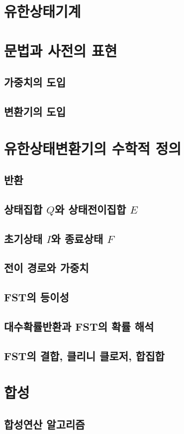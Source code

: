 \documentclass[../main.tex]{subfiles}
\begin{document}
\section{유한상태기계}
\section{문법과 사전의 표현}
\subsection{가중치의 도입}
\subsection{변환기의 도입}
\section{유한상태변환기의 수학적 정의}
\subsection{반환}
\subsection{상태집합 $Q$와 상태전이집합 $E$}
\subsection{초기상태 $I$와 종료상태 $F$}
\subsection{전이 경로와 가중치}
\subsection{FST의 등이성}
\subsection{대수확률반환과 FST의 확률 해석}
\subsection{FST의 결합, 클리니 클로저, 합집합}
\section{합성}
\subsection{합성연산 알고리즘}
\end{document}
